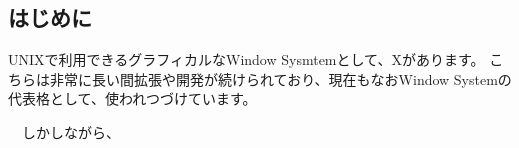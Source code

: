 
\subsection{はじめに}

 UNIXで利用できるグラフィカルなWindow Sysmtemとして、Xがあります。
こちらは非常に長い間拡張や開発が続けられており、現在もなおWindow Systemの
代表格として、使われつづけています。

　しかしながら、

